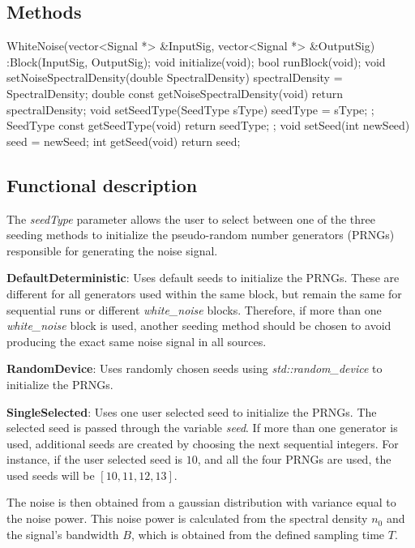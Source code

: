 \subsection*{Methods}

WhiteNoise(vector<Signal *> \&InputSig, vector<Signal *> \&OutputSig) :Block(InputSig, OutputSig){};
\bigbreak	
void initialize(void);
\bigbreak
bool runBlock(void);
\bigbreak
void setNoiseSpectralDensity(double SpectralDensity) { spectralDensity = SpectralDensity; }
\bigbreak
double const getNoiseSpectralDensity(void){ return spectralDensity; }
\bigbreak
void setSeedType(SeedType sType){ seedType = sType; };
\bigbreak
SeedType const getSeedType(void){ return seedType; };
\bigbreak
void setSeed(int newSeed) { seed = newSeed; }
\bigbreak
int getSeed(void){ return seed; }

\subsection*{Functional description}

The \textit{seedType} parameter allows the user to select between one of the three seeding methods to initialize the pseudo-random number generators (PRNGs) responsible for generating the noise signal.


\textbf{DefaultDeterministic}: Uses default seeds to initialize the PRNGs. These are different for all generators used within the same block, but remain the same for sequential runs or different \textit{white\_noise} blocks. Therefore, if more than one \textit{white\_noise} block is used, another seeding method should be chosen to avoid producing the exact same noise signal in all sources.

\textbf{RandomDevice}: Uses randomly chosen seeds using \textit{std::random\_device} to initialize the PRNGs.

\textbf{SingleSelected}: Uses one user selected seed to initialize the PRNGs. The selected seed is passed through the variable \textit{seed}. If more than one generator is used, additional seeds are created by choosing the next sequential integers. For instance, if the user selected seed is $10$, and all the four PRNGs are used, the used seeds will be $[10, 11, 12, 13]$.

The noise is then obtained from a gaussian distribution with variance equal to the noise power. This noise power is calculated from the spectral density $n_0$ and the signal's bandwidth $B$, which is obtained from the defined sampling time $T$.

